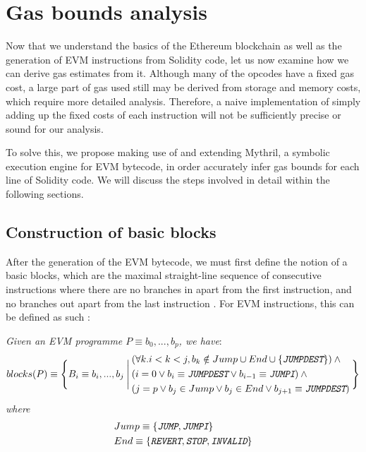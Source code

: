 \chapter{Gas bounds analysis}
\label{chap:gasbounds}

Now that we understand the basics of the Ethereum blockchain as well as 
the generation of EVM instructions from Solidity code, let us now examine
how we can derive gas estimates from it. Although many 
of the opcodes have a fixed gas cost, a large part of gas used still may be derived from 
storage and memory costs, which require more detailed analysis. Therefore, a
naive implementation of simply adding up the fixed costs of each instruction
will not be sufficiently precise or sound for our analysis.

To solve this, we propose making use of and extending Mythril, a symbolic execution engine for EVM bytecode,
in order accurately infer gas bounds for each line of Solidity code. We will discuss the steps involved in detail within
the following sections.

\section{Construction of basic blocks}

After the generation of the EVM bytecode, we must first define the notion of a basic blocks, 
which are the maximal straight-line sequence of consecutive instructions where there are no branches
in apart from the first instruction, and no branches out apart from the last instruction 
\cite{HennessyPatterson12}. For EVM instructions, this can be defined as such \cite{constructcfg}:

\begin{definition}

  \textit{Given an EVM programme $P \equiv b_0,...,b_p$, we have}:
  \[
    blocks(P) \equiv \Bigg\{ B_i \equiv b_i,...,b_j \:\Bigg|\:
    \begin{aligned}
      & (\forall k.i < k < j, b_k \notin Jump \cup End \cup \{ \textit{\texttt{JUMPDEST}} \}) \: \land  \\
      & (i = 0 \lor b_i \equiv \textit{\texttt{JUMPDEST}} \lor b_{i-1} \equiv \textit{\texttt{JUMPI}}) \: \land \\
      & (j = p \lor b_j \in Jump \lor b_j \in End \lor b_{j+1} \equiv \textit{\texttt{JUMPDEST}})
    \end{aligned}
    \:
    \Bigg\}
  \]
  \textit{where}
  \[
    \begin{aligned}
    &Jump \equiv \{ \textit{\texttt{JUMP}}, \textit{\texttt{JUMPI}} \} \\
    &End \equiv \{ \textit{\texttt{REVERT}}, \textit{\texttt{STOP}}, \textit{\texttt{INVALID}} \}
    \end{aligned}
  \]

\end{definition}

